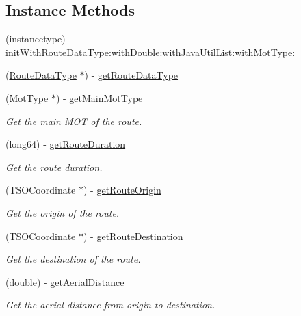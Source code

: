 \subsection*{Instance Methods}
\begin{DoxyCompactItemize}
\item 
(instancetype) -\/ \hyperlink{interface_a_route_data_a814626b1b0976eb940fcd28663dba869}{init\+With\+Route\+Data\+Type\+:with\+Double\+:with\+Java\+Util\+List\+:with\+Mot\+Type\+:}
\item 
(\hyperlink{interface_route_data_type}{Route\+Data\+Type} $\ast$) -\/ \hyperlink{interface_a_route_data_a83ae0240b6c6d74eec48c18affef5ed8}{get\+Route\+Data\+Type}
\item 
(Mot\+Type $\ast$) -\/ \hyperlink{interface_a_route_data_ae03003d7d3e0c495d97f6937bc2574d6}{get\+Main\+Mot\+Type}
\begin{DoxyCompactList}\small\item\em Get the main M\+O\+T of the route. \end{DoxyCompactList}\item 
(long64) -\/ \hyperlink{interface_a_route_data_acf451f91518fbe41d9846b5e99b4a0ea}{get\+Route\+Duration}
\begin{DoxyCompactList}\small\item\em Get the route duration. \end{DoxyCompactList}\item 
(T\+S\+O\+Coordinate $\ast$) -\/ \hyperlink{interface_a_route_data_a513d887d679c5ffb311f213b7835b783}{get\+Route\+Origin}
\begin{DoxyCompactList}\small\item\em Get the origin of the route. \end{DoxyCompactList}\item 
(T\+S\+O\+Coordinate $\ast$) -\/ \hyperlink{interface_a_route_data_a599be9184e3535898f97c7e382c16a59}{get\+Route\+Destination}
\begin{DoxyCompactList}\small\item\em Get the destination of the route. \end{DoxyCompactList}\item 
(double) -\/ \hyperlink{interface_a_route_data_a57b500e1b2d8360f24004039a4aa4ad6}{get\+Aerial\+Distance}
\begin{DoxyCompactList}\small\item\em Get the aerial distance from origin to destination. \end{DoxyCompactList}\item 

\end{DoxyCompactItemize}

